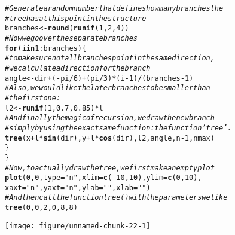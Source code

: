 \documentclass[12pt,a4paper]{scrartcl}\usepackage[]{graphicx}\usepackage[]{color}
\makeatletter
\def\maxwidth{ %
  \ifdim\Gin@nat@width>\linewidth
    \linewidth
  \else
    \Gin@nat@width
  \fi
}
\newcommand{\hlnum}[1]{\textcolor[rgb]{0.686,0.059,0.569}{#1}}%
\newcommand{\hlstr}[1]{\textcolor[rgb]{0.192,0.494,0.8}{#1}}%
\newcommand{\hlcom}[1]{\textcolor[rgb]{0.678,0.584,0.686}{\textit{#1}}}%
\newcommand{\hlopt}[1]{\textcolor[rgb]{0,0,0}{#1}}%
\newcommand{\hlstd}[1]{\textcolor[rgb]{0.345,0.345,0.345}{#1}}%
\newcommand{\hlkwa}[1]{\textcolor[rgb]{0.161,0.373,0.58}{\textbf{#1}}}%
\newcommand{\hlkwb}[1]{\textcolor[rgb]{0.69,0.353,0.396}{#1}}%
\newcommand{\hlkwc}[1]{\textcolor[rgb]{0.333,0.667,0.333}{#1}}%
\newcommand{\hlkwd}[1]{\textcolor[rgb]{0.737,0.353,0.396}{\textbf{#1}}}%
\newenvironment{kframe}{%
 \def\at@end@of@kframe{}%
 \ifinner\ifhmode%
  \def\at@end@of@kframe{\end{minipage}}%
  \begin{minipage}{\columnwidth}%
 \fi\fi%
 \def\FrameCommand##1{\hskip\@totalleftmargin \hskip-\fboxsep
 \colorbox{shadecolor}{##1}\hskip-\fboxsep
     \hskip-\linewidth \hskip-\@totalleftmargin \hskip\columnwidth}%
 \MakeFramed {\advance\hsize-\width
   \@totalleftmargin\z@ \linewidth\hsize
   \@setminipage}}%
 {\par\unskip\endMakeFramed%
 \at@end@of@kframe}
\newenvironment{knitrout}{}{} %
\makeatother
\begin{document}
\begin{Answer}
\begin{knitrout}
\begin{kframe}
\begin{alltt}
\hlcom{# Generate a random number that defines how many branches the}
\hlcom{# tree has at this point in the structure}
\hlstd{branches}\hlkwb{<-}\hlkwd{round}\hlstd{(}\hlkwd{runif}\hlstd{(}\hlnum{1}\hlstd{,}\hlnum{2}\hlstd{,}\hlnum{4}\hlstd{))}
\hlcom{# Now we go over the separate branches}
\hlkwa{for}\hlstd{(i} \hlkwa{in} \hlnum{1}\hlopt{:}\hlstd{branches)\{}
\hlcom{# to make sure not all branches point in the same direction,}
\hlcom{# we calculate a direction for the branch}
\hlstd{angle}\hlkwb{<-}\hlstd{dir}\hlopt{+}\hlstd{(}\hlopt{-}\hlstd{pi}\hlopt{/}\hlnum{6}\hlstd{)}\hlopt{+}\hlstd{(pi}\hlopt{/}\hlnum{3}\hlstd{)}\hlopt{*}\hlstd{(i}\hlopt{-}\hlnum{1}\hlstd{)}\hlopt{/}\hlstd{(branches}\hlopt{-}\hlnum{1}\hlstd{)}
\hlcom{# Also, we would like the later branches to be smaller than}
\hlcom{# the first one:}
\hlstd{l2}\hlkwb{<-}\hlkwd{runif}\hlstd{(}\hlnum{1}\hlstd{,}\hlnum{0.7}\hlstd{,}\hlnum{0.85}\hlstd{)}\hlopt{*}\hlstd{l}
\hlcom{# And finally the magic of recursion, we draw the new branch}
\hlcom{# simply by using theexact same function: the function 'tree'.}
\hlkwd{tree}\hlstd{(x}\hlopt{+}\hlstd{l}\hlopt{*}\hlkwd{sin}\hlstd{(dir),y}\hlopt{+}\hlstd{l}\hlopt{*}\hlkwd{cos}\hlstd{(dir),l2,angle,n}\hlopt{-}\hlnum{1}\hlstd{,nmax)}
\hlstd{\}}
\hlstd{\}}
\hlcom{# Now, to actually draw the tree, we first make an empty plot}
\hlkwd{plot}\hlstd{(}\hlnum{0}\hlstd{,}\hlnum{0}\hlstd{,}\hlkwc{type}\hlstd{=}\hlstr{"n"}\hlstd{,}\hlkwc{xlim}\hlstd{=}\hlkwd{c}\hlstd{(}\hlopt{-}\hlnum{10}\hlstd{,}\hlnum{10}\hlstd{),}\hlkwc{ylim}\hlstd{=}\hlkwd{c}\hlstd{(}\hlnum{0}\hlstd{,}\hlnum{10}\hlstd{),}
\hlkwc{xaxt}\hlstd{=}\hlstr{"n"}\hlstd{,}\hlkwc{yaxt}\hlstd{=}\hlstr{"n"}\hlstd{,}\hlkwc{ylab}\hlstd{=}\hlstr{""}\hlstd{,}\hlkwc{xlab}\hlstd{=}\hlstr{""}\hlstd{)}
\hlcom{# And then call the function tree() with the parameters we like}
\hlkwd{tree}\hlstd{(}\hlnum{0}\hlstd{,}\hlnum{0}\hlstd{,}\hlnum{2}\hlstd{,}\hlnum{0}\hlstd{,}\hlnum{8}\hlstd{,}\hlnum{8}\hlstd{)}
\end{alltt}
\end{kframe}
\texttt{[image: figure/unnamed-chunk-22-1]} 

\end{knitrout}
\end{Answer}
\end{document}
